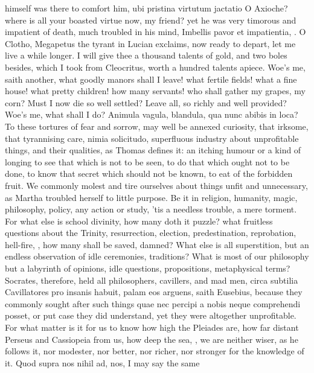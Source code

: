 {{himself was there to comfort him, ubi pristina virtutum jactatio O
Axioche? where is all your boasted virtue now, my friend? yet he was
very timorous and impatient of death, much troubled in his mind,
Imbellis pavor et impatientia, \etc{}. O Clotho, Megapetus the tyrant in
Lucian exclaims, now ready to depart, let me live a while longer.
I will give thee a thousand talents of gold, and two boles
besides, which I took from Cleocritus, worth a hundred talents apiece.
Woe's me,  saith another, what goodly manors shall I leave! what
fertile fields! what a fine house! what pretty children! how many
servants! who shall gather my grapes, my corn? Must I now die so well
settled? Leave all, so richly and well provided? Woe's me, what shall I
do? Animula vagula, blandula, qua nunc abibis in loca?
To these tortures of fear and sorrow, may well be annexed curiosity,
that irksome, that tyrannising care, nimia solicitudo,
superfluous industry about unprofitable things, and their
qualities, as Thomas defines it: an itching humour or a kind of longing
to see that which is not to be seen, to do that which ought not to be
done, to know that secret which should not be known, to eat of
the forbidden fruit. We commonly molest and tire ourselves about things
unfit and unnecessary, as Martha troubled herself to little purpose. Be
it in religion, humanity, magic, philosophy, policy, any action or
study, 'tis a needless trouble, a mere torment. For what else is school
divinity, how many doth it puzzle? what fruitless questions about the
Trinity, resurrection, election, predestination, reprobation,
hell-fire, \etc{}, how many shall be saved, damned? What else is all
superstition, but an endless observation of idle ceremonies,
traditions? What is most of our philosophy but a labyrinth of opinions,
idle questions, propositions, metaphysical terms? Socrates, therefore,
held all philosophers, cavillers, and mad men, circa subtilia
Cavillatores pro insanis habuit, palam eos arguens, saith
Eusebius, because they commonly sought after such things quae nec
percipi a nobis neque comprehendi posset, or put case they did
understand, yet they were altogether unprofitable. For what matter is
it for us to know how high the Pleiades are, how far distant Perseus
and Cassiopeia from us, how deep the sea, \etc{}, we are neither wiser, as
he follows it, nor modester, nor better, nor richer, nor stronger for
the knowledge of it. Quod supra nos nihil ad, nos, I may say the same
}}
